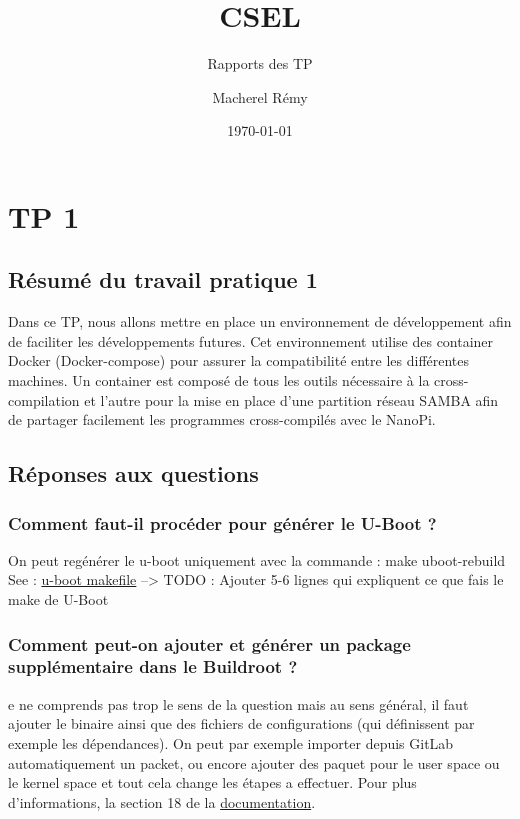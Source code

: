 \documentclass{ReportTemplate}
\title{CSEL}
\author{Macherel Rémy}
\date{\today}
\subtitle{Rapports des TP}
\begin{document}
\maketitlepage

\newpage

\maketableofcontent

\medskip
\chapter{TP 1}

\section{Résumé du travail pratique 1}
Dans ce TP, nous allons mettre en place un environnement de développement afin
de faciliter les développements futures. Cet environnement utilise des container
Docker (Docker-compose) pour assurer la compatibilité entre les différentes
machines. Un container est composé de tous les outils nécessaire à la
cross-compilation et l'autre pour la mise en place d'une partition réseau SAMBA
afin de partager facilement les programmes cross-compilés avec le NanoPi.
\section{Réponses aux questions}
\subsection{Comment faut-il procéder pour générer le U-Boot ?}
On peut regénérer le u-boot uniquement avec la commande : make
uboot-rebuild\newline
See : \href{https://github.com/ARM-software/u-boot/blob/master/Makefile}{u-boot makefile} \newline
--> TODO : Ajouter 5-6 lignes qui expliquent ce que fais le make de U-Boot
\subsection{Comment peut-on ajouter et générer un package supplémentaire dans le Buildroot ?}
e ne comprends pas trop le sens de la question mais au sens général, il faut
ajouter le binaire ainsi que des fichiers de configurations (qui définissent par
exemple les dépendances). On peut par exemple importer depuis GitLab
automatiquement un packet, ou encore ajouter des paquet pour le user space ou le
kernel space et tout cela change les étapes a effectuer. Pour plus
d'informations, la section 18 de la
\href{https://buildroot.org/downloads/manual/manual.html#adding-packages}{documentation}.
\end{document}
